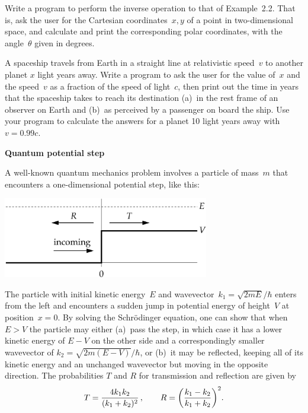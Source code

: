 \documentclass[12pt]{article}
\begin{document}
\begin{exercises}

\exercise Write a program to perform the inverse operation to that of
Example~2.2.  That is, ask the user for the Cartesian coordinates~$x,y$ of
a point in two-dimensional space, and calculate and print the corresponding
polar coordinates, with the angle~$\theta$ given in degrees.



\exercise A spaceship travels from Earth in a straight line at relativistic
speed~$v$ to another planet $x$ light years away.  Write a program to ask
the user for the value of~$x$ and the speed~$v$ as a fraction of the speed
of light~$c$, then print out the time in years that the spaceship takes to
reach its destination (a)~in the rest frame of an observer on Earth and
(b)~as perceived by a passenger on board the ship.  Use your program to
calculate the answers for a planet 10 light years away with $v=0.99c$.



\exercise \textbf{Quantum potential step}

\exskip A well-known quantum mechanics problem involves a particle of
mass~$m$ that encounters a one-dimensional potential step, like this:
\medskip
\begin{center}
\includegraphics[width=9cm]{qstep.eps}
\end{center}
\smallskip The particle with initial kinetic energy~$E$ and
wavevector~$k_1=\sqrt{2mE}/\hbar$ enters from the left and encounters a
sudden jump in potential energy of height~$V$ at position~$x=0$.  By
solving the Schr\"odinger equation, one can show that when $E>V$ the
particle may either (a)~pass the step, in which case it has a lower kinetic
energy of $E-V$ on the other side and a correspondingly smaller wavevector
of $k_2=\sqrt{2m(E-V)}/\hbar$, or (b)~it may be reflected, keeping all of
its kinetic energy and an unchanged wavevector but moving in the opposite
direction.  The probabilities $T$ and $R$ for transmission and
reflection are given by
\begin{displaymath}
T = {4k_1k_2\over(k_1+k_2)^2}\,,\qquad
R = \biggl( {k_1-k_2\over k_1+k_2} \biggr)^2.
\end{displaymath}


\end{exercises}
\end{document}
